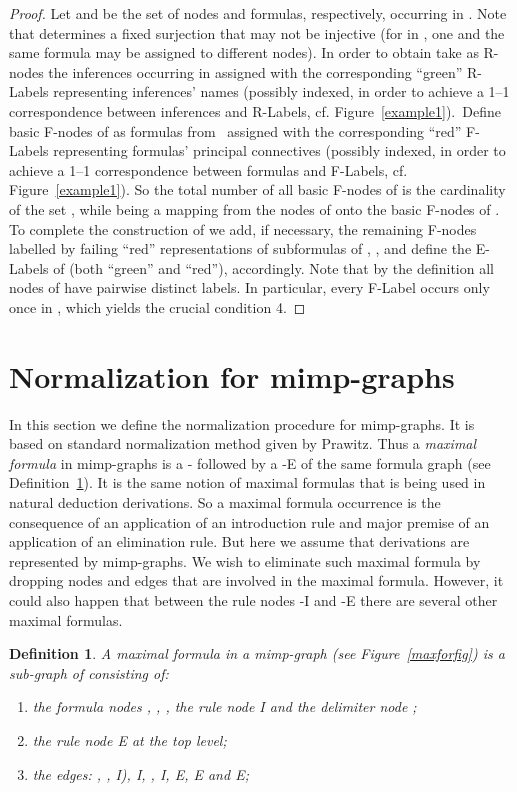 \documentclass[submission,copyright,creativecommons]{eptcs}
\newtheorem{definition}{Definition}
\begin{document}
\begin{proof}
Let  and  be the set of nodes and formulas, respectively, occurring in 
. Note that  determines a fixed surjection 
that may not be injective (for in , one and the same formula may be
assigned to different nodes). In order to obtain  take as R-nodes
the inferences occurring in  assigned with the corresponding ``green''
R-Labels representing inferences' names (possibly indexed, in order to
achieve a 1--1 correspondence between inferences and R-Labels, cf. Figure~\ref{example1}).\ 
Define basic F-nodes of  as formulas from \ assigned with
the corresponding ``red'' F-Labels representing formulas' principal
connectives (possibly indexed, in order to achieve a 1--1 correspondence
between formulas and F-Labels, cf. Figure~\ref{example1}). So the total number of all
basic F-nodes of  is the cardinality of the set , while 
being a mapping from the nodes of  onto the basic F-nodes of . To complete the construction of  we add, if necessary, the
remaining F-nodes labelled by failing ``red'' representations of subformulas
of , , and define the E-Labels of  (both ``green''
and ``red''), accordingly. Note that by the definition all nodes of  have pairwise distinct labels. In particular, every F-Label occurs only
once in , which yields the crucial condition 4.
\end{proof}

\section{Normalization for mimp-graphs}\label{sec:normal}

In this section we define the normalization procedure for mimp-graphs. It is
based on standard normalization method given by Prawitz. Thus a \emph{maximal formula} in mimp-graphs is a - followed by a -E of the same formula graph (see Definition~\ref{maxformula}).
It is the same notion of maximal formulas that is being used in natural
deduction derivations. So a maximal formula occurrence is the consequence of
an application of an introduction rule and major premise of an application
of an elimination rule. But here we assume that derivations are represented
by mimp-graphs. We wish to eliminate such maximal formula by dropping nodes
and edges that are involved in the maximal formula. However, it could also
happen that between the rule nodes -I and -E
there are several other maximal formulas. 

\begin{definition}
\label{maxformula} A \emph{maximal formula}  in a mimp-graph  (see
Figure~\ref{maxforfig}) is a sub-graph of  consisting of:

\begin{enumerate}
\item  the formula nodes , , , the rule node I and the delimiter node ;

\item  the rule node E at the top level;

\item  the edges: , , I), I, , I,  E, E and E;
\end{enumerate}
\end{definition}
\end{document}
